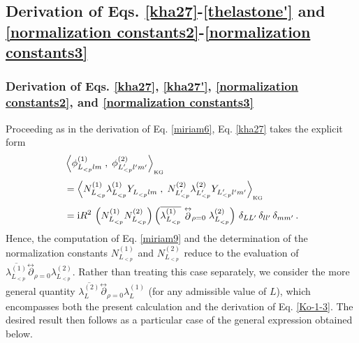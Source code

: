 \documentclass[aps,twocolumn,nofootinbib]{revtex4}
\begin{document}
{\begin{appendix}
\subsection{Derivation of Eqs. \eqref{kha27}-\eqref{thelastone'} and  \eqref{normalization constants2}-\eqref{normalization constants3}}\label{norm-com1}


\subsubsection{Derivation of Eqs. \eqref{kha27}, \eqref{kha27'}, \eqref{normalization constants2}, and \eqref{normalization constants3}}

Proceeding as in the derivation of Eq. \eqref{miriam6}, Eq. \eqref{kha27} takes the explicit form
\begin{align}\label{miriam9}
    &\left\langle \phi^{(1)}_{L^{}_{< p}lm} \;,\; \phi^{(2)}_{L^\prime_{< p}l^\prime_{}m^\prime_{}}\right\rangle_{\vphantom{}_{\text{KG}}} \nonumber\\[3pt]
    &= \left\langle N^{(1)}_{L^{}_{< p}} \lambda_{L^{}_{< p}}^{(1)} Y^{}_{L^{}_{< p}lm} \;,\; N^{(2)}_{L^{\prime}_{< p}} \lambda_{L^{\prime}_{< p}}^{(2)} Y^{}_{L^\prime_{< p}l^\prime_{}m^\prime_{}}\right\rangle_{\vphantom{}_{\text{KG}}} \nonumber\\[3pt]
    &= \mathrm{i} R^2 \, \left(N^{(1)}_{L^{}_{< p}} N^{(2)}_{L^{}_{< p}}\right) \left( \overline{\lambda_{L^{}_{< p}}^{(1)}} \stackrel{\leftrightarrow}{\partial}_{\rho=0} \lambda_{L^{}_{< p}}^{(2)} \right) \,\delta_{LL^\prime} \,\delta_{ll^\prime} \,\delta_{mm^\prime}\,.
\end{align}
Hence, the computation of Eq. \eqref{miriam9} and the determination of the normalization constants $N^{(1)}_{L^{}_{< p}}$ and $N^{(2)}_{L^{}_{< p}}$ reduce to the evaluation of $\overline{\lambda_{L^{}_{<p}}^{(1)}} \stackrel{\leftrightarrow}{\partial}_{\rho=0} \lambda_{L^{}_{<p}}^{(2)}$. Rather than treating this case separately, we consider the more general quantity $\overline{\lambda_L^{(2)}}\stackrel{\leftrightarrow}{\partial}_{\rho=0}\lambda_L^{(1)}$ (for any admissible value of $L$), which encompasses both the present calculation and the derivation of Eq. \eqref{Ko-1-3}. The desired result then follows as a particular case of the general expression obtained below. 


\end{appendix}}
\end{document}

